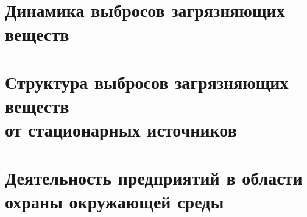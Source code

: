 







\section{Динамика выбросов загрязняющих веществ}
\begin{frame}{\insertsectionhead}
\end{frame}

\section{Структура выбросов загрязняющих веществ \\ от
стационарных источников}
\begin{frame}{\insertsectionhead}
\end{frame}



\section{Деятельность предприятий в области \\ охраны окружающей среды}
\begin{frame}{\insertsectionhead}
\end{frame}






